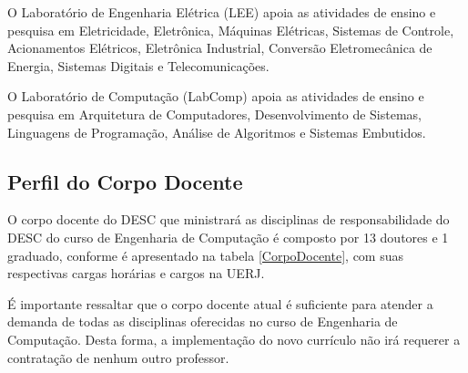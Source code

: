 O Laboratório de Engenharia Elétrica (LEE) apoia as atividades de ensino e pesquisa em Eletricidade, Eletrônica, Máquinas Elétricas, Sistemas de Controle, Acionamentos Elétricos, Eletrônica Industrial, Conversão Eletromecânica de Energia, Sistemas Digitais e Telecomunicações.

O Laboratório de Computação (LabComp) apoia as atividades de ensino e pesquisa em Arquitetura de Computadores, Desenvolvimento de Sistemas, Linguagens de Programação, Análise de Algoritmos e Sistemas Embutidos.

\subsection{Perfil do Corpo Docente}
O corpo docente do DESC que ministrará as disciplinas de responsabilidade do DESC do curso de Engenharia de Computação é composto por 13 doutores e 1 graduado, conforme é apresentado na tabela \ref{CorpoDocente}, com suas respectivas cargas horárias e cargos na UERJ.


É importante ressaltar que o corpo docente atual é suficiente para atender a demanda de todas as disciplinas oferecidas no curso de Engenharia de Computação. Desta forma, a implementação do novo currículo não irá requerer a contratação de nenhum outro professor.

